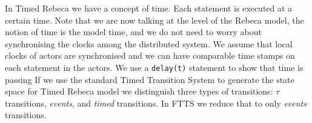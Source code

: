 In Timed Rebeca we have a concept of time. Each statement is executed at a certain time. Note that we are now talking at the level of the Rebeca model, the notion of time is the model time, and we do not need to worry about synchronising the clocks among the distributed system. We assume that local clocks of actors are synchronised and we can have comparable time stamps on each statement in the actors.
We use a \texttt{delay(t)} statement to show that time is passing
%
If we use the standard Timed Transition System to generate the state space for Timed Rebeca model we distinguish three types of transitions: $\tau$ transitions, \textit{events}, and \textit{timed} transitions.
In FTTS we reduce that to only \textit{events} transitions.
%






